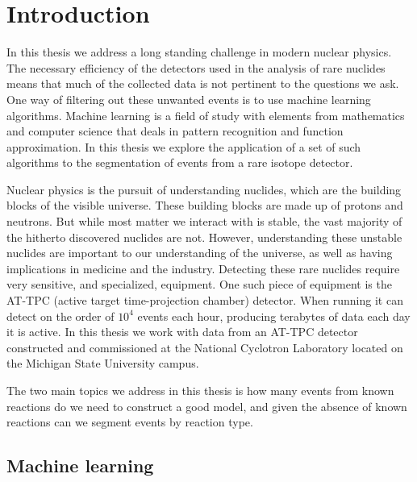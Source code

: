 \chapter{Introduction}\label{ch:introduction}

In this thesis we address a long standing challenge in modern nuclear physics. 
The necessary efficiency of the detectors used in the analysis of rare nuclides means that much of the collected data is not pertinent to the questions we ask. One way of filtering out these unwanted events is to use machine learning algorithms. Machine learning is a field of study with elements from mathematics and computer science that deals in pattern recognition and function approximation. In this thesis we explore the application of a set of such algorithms to the segmentation of events from a rare isotope detector.

Nuclear physics is the pursuit of understanding nuclides, which are the building blocks of the visible universe. These building blocks are made up of protons and neutrons. But while most matter we interact with is stable, the vast majority of the hitherto discovered nuclides are not. However, understanding these unstable nuclides are important to our understanding of the universe, as well as having implications in medicine and the industry. Detecting these rare nuclides require very sensitive, and specialized, equipment. One such piece of equipment is the AT-TPC (active target time-projection chamber) detector. When running it can detect on the order of $10^4$ events each hour, producing terabytes of data each day it is active. In this thesis we work with data from an AT-TPC detector constructed and commissioned at the National Cyclotron Laboratory located on the Michigan State University campus. 

The two main topics we address in this thesis is how many events from known reactions do we need to construct a good model, and given the absence of known reactions can we segment events by reaction type. 

\section{Machine learning}

